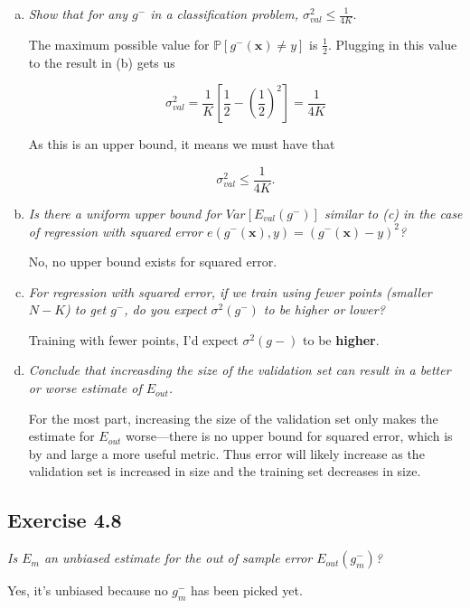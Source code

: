 \documentclass{article}
\renewcommand{\vec}[1]{\mathbf{#1}}
\begin{document}
\begin{enumerate}[(a)]
  \item \textit{Show that for any $g^-$ in a classification problem, $\sigma_{val}^2\leq
    \frac{1}{4K}.$}

    The maximum possible value for $\mathbb{P}[g^-(\vec{x}) \neq y]$ is $\frac{1}{2}$. Plugging
    in this value to the result in (b) gets us

    $$\sigma_{val}^2 = \frac{1}{K}\left[\frac{1}{2} - \left(\frac{1}{2}\right)^2\right] = \frac{1}{4K}$$

    As this is an upper bound, it means we must have that

    $$\sigma_{val}^2 \leq \frac{1}{4K}.$$

  \item \textit{Is there a uniform upper bound for $Var[E_{val}(g^-)]$  similar to (c) in the
    case of regression with squared error $e(g^-(\vec{x}), y) = (g^-(\vec{x})-y)^2$?}

    No, no upper bound exists for squared error.

  \item \textit{For regression with squared error, if we train using fewer points (smaller 
    $N-K$) to get $g^-$, do you expect $\sigma^2(g^-)$ to be higher or lower?}

    Training with fewer points, I'd expect $\sigma^2(g-)$ to be \textbf{higher}.

  \item \textit{Conclude that increasding the size of the validation set can result in a better
    or worse estimate of $E_{out}$.}

    For the most part, increasing the size of the validation set only makes the estimate for 
    $E_{out}$ worse---there is no upper bound for squared error, which is by and large a more
    useful metric. Thus error will likely increase as the validation set is increased in size and
    the training set decreases in size.

\end{enumerate}

\subsection*{Exercise 4.8}

\textit{Is $E_m$ an unbiased estimate for the out of sample error $E_{out}(g^-_m)$?}

\smallskip

Yes, it's unbiased because no $g_m^-$ has been picked yet.
\end{document}
